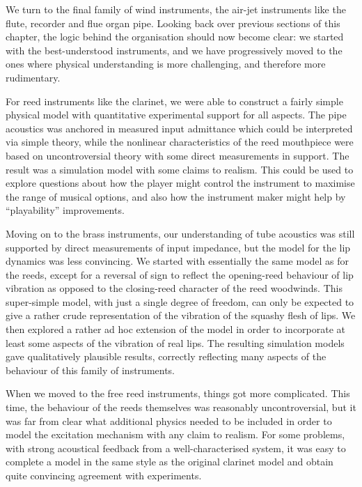 

  We turn to the final family of wind instruments, the air-jet instruments like 
  the flute, recorder and flue organ pipe. Looking back over previous sections 
  of this chapter, the logic behind the organisation should now become clear: 
  we started with the best-understood instruments, and we have progressively 
  moved to the ones where physical understanding is more challenging, and 
  therefore more rudimentary. 

  For reed instruments like the clarinet, we were able to construct a fairly 
  simple physical model with quantitative experimental support for all aspects. 
  The pipe acoustics was anchored in measured input admittance which could be 
  interpreted via simple theory, while the nonlinear characteristics of the 
  reed mouthpiece were based on uncontroversial theory with some direct 
  measurements in support. The result was a simulation model with some claims 
  to realism. This could be used to explore questions about how the player 
  might control the instrument to maximise the range of musical options, and 
  also how the instrument maker might help by “playability” improvements. 

  Moving on to the brass instruments, our understanding of tube acoustics was 
  still supported by direct measurements of input impedance, but the model for 
  the lip dynamics was less convincing. We started with essentially the same 
  model as for the reeds, except for a reversal of sign to reflect the 
  opening-reed behaviour of lip vibration as opposed to the closing-reed 
  character of the reed woodwinds. This super-simple model, with just a single 
  degree of freedom, can only be expected to give a rather crude representation 
  of the vibration of the squashy flesh of lips. We then explored a rather ad 
  hoc extension of the model in order to incorporate at least some aspects of 
  the vibration of real lips. The resulting simulation models gave 
  qualitatively plausible results, correctly reflecting many aspects of the 
  behaviour of this family of instruments. 

  When we moved to the free reed instruments, things got more complicated. This 
  time, the behaviour of the reeds themselves was reasonably uncontroversial, 
  but it was far from clear what additional physics needed to be included in 
  order to model the excitation mechanism with any claim to realism. For some 
  problems, with strong acoustical feedback from a well-characterised system, 
  it was easy to complete a model in the same style as the original clarinet 
  model and obtain quite convincing agreement with experiments. 


